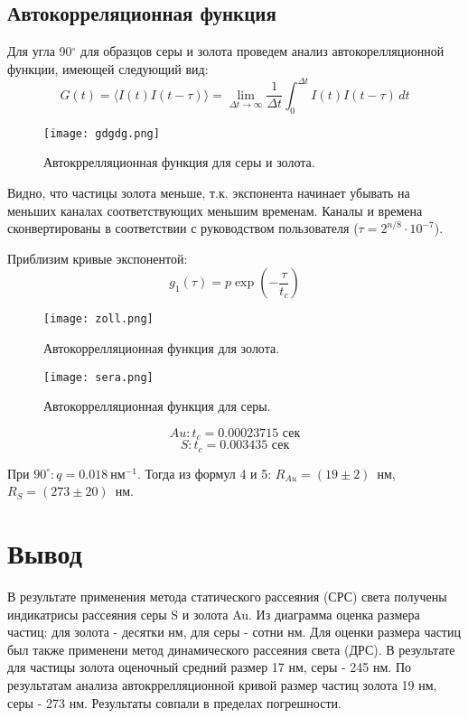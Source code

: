 \documentclass[a4paper,10pt]{article}
\begin{document}
\subsection{Автокорреляционная функция}
 Для угла 90$^{\circ}$ для образцов серы и золота проведем анализ автокорелляционной функции, имеющей следующий вид:
\begin{equation}
   G(t) = \langle I(t)I(t-\tau) \rangle = \lim_{\Delta t\rightarrow\infty}\frac{1}{\Delta t}\int_{0}^{\Delta t} I(t)I(t-\tau)\,dt
\end{equation}


\begin{figure}[H]
    \centering
    \texttt{[image: gdgdg.png]}
    \caption{Автокррелляционная функция для серы и золота.}
    \label{fig:enter-label}
\end{figure}

Видно, что частицы золота меньше, т.к. экспонента начинает убывать на меньших каналах соответствующих меньшим временам. Каналы и времена сконвертированы в соответствии с руководством пользователя ($\tau = 2^{n/8} \cdot 10^{-7}$).

Приблизим кривые экспонентой:
\begin{equation*}
    g_{1}(\tau) = p\exp{\left(-\frac{\tau}{t_{c}}\right)}
\end{equation*}

\begin{figure}[H]
    \centering
    \texttt{[image: zoll.png]}
    \caption{Автокоррелляционная функция для золота.}
    \label{fig:enter-label}
\end{figure}

\begin{figure}[H]
    \centering
    \texttt{[image: sera.png]}
    \caption{Автокоррелляционная функция для серы.}
    \label{fig:enter-label}
\end{figure}
\begin{equation*}
    Au: t_{c} = 0.00023715 \text{ сек}
\end{equation*}
\begin{equation*}
    S: t_{c} = 0.003435 \text{ сек}
\end{equation*}

При $90^{\circ}: q = 0.018~\text{нм}^{-1}$. Тогда из формул 4 и 5:  $R_{Au} = (19\pm 2)$~нм,  $R_{S} = (273\pm 20)$~нм.

\section{Вывод}
В результате применения метода статического рассеяния (СРС) света получены индикатрисы рассеяния серы S и золота Au. Из диаграмма оценка размера частиц: для золота - десятки нм, для серы - сотни нм. Для оценки размера частиц был также применени метод динамического рассеяния света (ДРС). В результате для частицы золота оценочный средний размер 17 нм, серы - 245 нм. По результатам анализа автокррелляционной кривой размер частиц золота 19 нм, серы - 273 нм. Результаты совпали в пределах погрешности.
\end{document}
